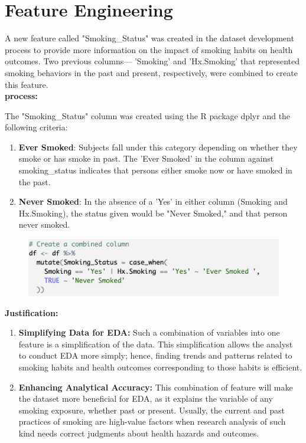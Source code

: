 \documentclass[12pt]{article}
\begin{document}
\newpage


\section{Feature Engineering}
A new feature called "Smoking\_Status" was created in the dataset development process to provide more information on the impact of smoking habits on health outcomes. Two previous columns— 'Smoking' and 'Hx.Smoking' that represented smoking behaviors in the past and present, respectively, were combined to create this feature. \\ [0.3cm]
\textbf{process: }

The "Smoking\_Status" column was created using the R package dplyr and the following criteria:
\begin{enumerate}
    \item \textbf{Ever Smoked}:  Subjects fall under this category depending on whether they smoke or has smoke in past. The 'Ever Smoked' in the column against smoking\_status indicates that persons either smoke now or have smoked in the past.
    \item \textbf{Never Smoked}: In the absence of a 'Yes' in either column (Smoking and Hx.Smoking), the status given would be "Never Smoked," and that person never smoked.
\end{enumerate}

\begin{figure}[h]
    \centering
    \includegraphics[width=1.03\textwidth]{feature enge.png}  
        \label{fig:example}
   \vspace{0cm}
\end{figure}

\textbf{Justification: }
\begin{enumerate}
    \item \textbf{Simplifying Data for EDA:} Such a combination of variables into one feature is a simplification of the data. This simplification allows the analyst to conduct EDA more simply; hence, finding trends and patterns related to smoking habits and health outcomes corresponding to those habits is efficient.
    \item \textbf{Enhancing Analytical Accuracy:}  This combination of feature will make the dataset more beneficial for EDA, as it explains the variable of any smoking exposure, whether past or present. Usually, the current and past practices of smoking are high-value factors when research analysis of such kind needs correct judgments about health hazards and outcomes.
\end{enumerate}
\end{document}
